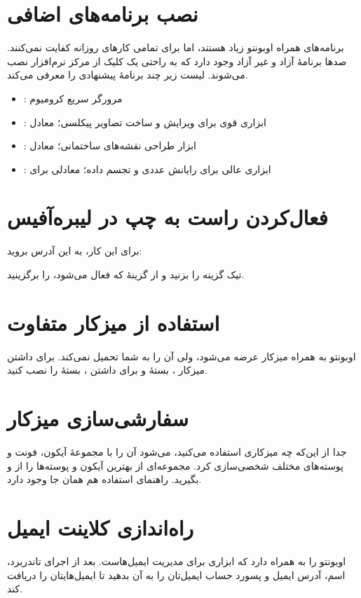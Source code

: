 \section{نصب برنامه‌های اضافی}
برنامه‌های همراه اوبونتو زیاد هستند، اما برای تمامی کارهای روزانه کفایت نمی‌کنند. صدها برنامهٔ آزاد و غیر آزاد وجود دارد که به راحتی یک کلیک از مرکز نرم‌افزار نصب می‌شوند. لیست زیر چند برنامهٔ پیشنهادی را معرفی می‌کند.
\begin{itemize}
\item {}: مرورگر سریع کرومیوم
\item {}: ابزاری قوی برای ویرایش و ساخت تصاویر پیکلسی؛ معادل 
\item {}: ابزار طراحی نقشه‌های ساختمانی؛ معادل 
\item {}: ابزاری عالی برای رایانش عددی و تجسم داده؛ معادلی برای 
\end{itemize}

\section{فعال‌کردن راست به چپ در لیبره‌آفیس}
برای این کار، به این آدرس بروید:\\
\begin{flushleft}
\end{flushleft}
تیک گزینه  را بزنید و از گزینهٔ  که فعال می‌شود،  را برگزینید.

\section{استفاده از میزکار متفاوت}
اوبونتو به همراه میزکار  عرضه می‌شود، ولی آن را به شما تحمیل نمی‌کند. برای داشتن میزکار ، بستهٔ  و برای داشتن ، بستهٔ  را نصب کنید.

\section{سفارشی‌سازی میزکار}
جدا از این‌که چه میزکاری استفاده می‌کنید، می‌شود آن را با مجموعهٔ آیکون، فونت و پوسته‌های مختلف شخصی‌سازی کرد. مجموعه‌ای از بهترین آیکون و پوسته‌ها را از  و  بگیرید. راهنمای استفاده هم همان جا وجود دارد.

\section{راه‌اندازی کلاینت ایمیل}
اوبونتو  را به همراه دارد که ابزاری برای مدیریت ایمیل‌هاست. بعد از اجرای تاندربرد، اسم، آدرس ایمیل و پسورد حساب ایمیل‌تان را به آن بدهید تا ایمیل‌هایتان را دریافت کند.

